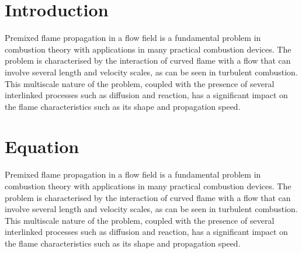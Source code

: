 \section{Introduction}
Premixed flame propagation in a flow field is a fundamental problem in combustion theory with applications in many practical combustion devices. The problem is characterised by the interaction of curved flame with a flow that can involve several length and velocity scales, as can be seen in turbulent combustion. This multiscale nature of the problem, coupled with the presence of several interlinked processes such as diffusion and reaction, has a significant impact on the flame characteristics such as its shape and propagation speed.

\section{Equation}
Premixed flame propagation in a flow field is a fundamental problem in combustion theory with applications in many practical combustion devices. The problem is characterised by the interaction of curved flame with a flow that can involve several length and velocity scales, as can be seen in turbulent combustion. This multiscale nature of the problem, coupled with the presence of several interlinked processes such as diffusion and reaction, has a significant impact on the flame characteristics such as its shape and propagation speed. 